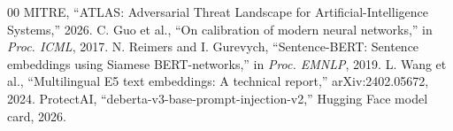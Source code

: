 \documentclass[conference]{IEEEtran}
\begin{document}
\begin{thebibliography}{00}
 MITRE, ``ATLAS: Adversarial Threat Landscape for Artificial-Intelligence Systems,'' 2026.
 C. Guo et al., ``On calibration of modern neural networks,'' in \textit{Proc. ICML}, 2017.
 N. Reimers and I. Gurevych, ``Sentence-BERT: Sentence embeddings using Siamese BERT-networks,'' in \textit{Proc. EMNLP}, 2019.
 L. Wang et al., ``Multilingual E5 text embeddings: A technical report,'' arXiv:2402.05672, 2024.
 ProtectAI, ``deberta-v3-base-prompt-injection-v2,'' Hugging Face model card, 2026.
\end{thebibliography}
\end{document}
